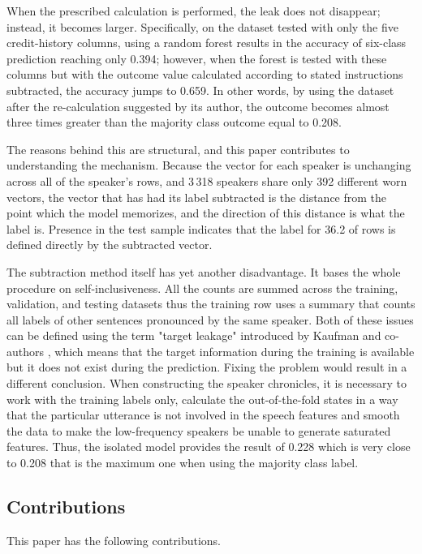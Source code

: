 \documentclass[10pt,twocolumn,twoside,a4paper]{article}
\begin{document}
When the prescribed calculation is performed, the leak does not disappear; instead, it becomes larger. Specifically, on the dataset tested with only the five credit-history columns, using a random forest results in the accuracy of six-class prediction reaching only 0.394; however, when the forest is tested with these columns but with the outcome value calculated according to stated instructions subtracted, the accuracy jumps to 0.659. In other words, by using the dataset after the re-calculation suggested by its author, the outcome becomes almost three times greater than the majority class outcome equal to 0.208.

The reasons behind this are structural, and this paper contributes to understanding the mechanism. Because the vector for each speaker is unchanging across all of the speaker's rows, and 3\,318 speakers share only 392 different worn vectors, the vector that has had its label subtracted is the distance from the point which the model memorizes, and the direction of this distance is what the label is. Presence in the test sample indicates that the label for 36.2 of rows is defined directly by the subtracted vector.

The subtraction method itself has yet another disadvantage. It bases the whole procedure on self-inclusiveness. All the counts are summed across the training, validation, and testing datasets thus the training row uses a summary that counts all labels of other sentences pronounced by the same speaker. Both of these issues can be defined using the term "target leakage" introduced by Kaufman and co-authors \cite{kaufman2012leakage}, which means that the target information during the training is available but it does not exist during the prediction. Fixing the problem would result in a different conclusion. When constructing the speaker chronicles, it is necessary to work with the training labels only, calculate the out-of-the-fold states in a way that the particular utterance is not involved in the speech features and smooth the data to make the low-frequency speakers be unable to generate saturated features. Thus, the isolated model provides the result of 0.228 which is very close to 0.208 that is the maximum one when using the majority class label.

\subsection{Contributions}

This paper has the following contributions.
\end{document}
